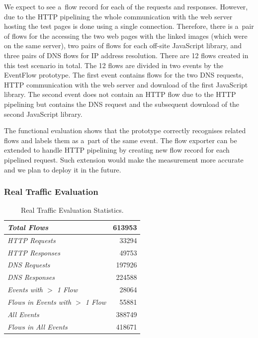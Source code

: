 We expect to see a~flow record for each of the requests and responses. However, due to the HTTP pipelining the whole communication with the web server hosting the test pages is done using a single connection. Therefore, there is a~pair of flows for the accessing the two web pages with the linked images (which were on the same server), two pairs of flows for each off-site JavaScript library, and three pairs of DNS flows for IP address resolution. There are 12 flows created in this test scenario in total. The 12 flows are divided in two events by the EventFlow prototype. The first event contains flows for the two DNS requests, HTTP communication with the web server and download of the first JavaScript library. The second event does not contain an HTTP flow due to the HTTP pipelining but contains the DNS request and the subsequent download of the second JavaScript library.

The functional evaluation shows that the prototype correctly recognises related flows and labels them as a~part of the same event. The flow exporter can be extended to handle HTTP pipelining by creating new flow record for each pipelined request. Such extension would make the measurement more accurate and we plan to deploy it in the future.

\subsubsection{Real Traffic Evaluation}

\begin{table}[!tb]
	\caption{Real Traffic Evaluation Statistics.}
	\centering
	\renewcommand{\arraystretch}{1.1}
	\begin{tabular}{|l|r|} \hline
		\textit{Total Flows} & 613953 \\ \hline
		\textit{HTTP Requests} & 33294  \\  \hline
		\textit{HTTP Responses} & 49753  \\  \hline
		\textit{DNS Requests} & 197926  \\  \hline
		\textit{DNS Responses} & 224588  \\  \hline
		\textit{Events with $>$ 1 Flow} & 28064  \\  \hline
		\textit{Flows in Events with $>$ 1 Flow} & 55881  \\  \hline
		\textit{All Events} & 388749 \\  \hline
		\textit{Flows in All Events} & 418671 \\  \hline
	\end{tabular}
	\label{tab:eventflow-stats}
\end{table}

